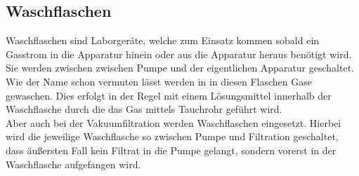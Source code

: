 \subsection{Waschflaschen}
Waschflaschen sind Laborgeräte, welche zum Einsatz kommen sobald ein Gasstrom in die Apparatur hinein oder aus die Apparatur heraus benötigt wird. Sie werden zwischen zwischen Pumpe und der eigentlichen Apparatur geschaltet. \\
Wie der Name schon vermuten lässt werden in in diesen Flaschen Gase gewaschen. Dies erfolgt in der Regel mit einem Lösungsmittel innerhalb der Waschflasche durch die das Gas mittels Tauchrohr geführt wird.\\
Aber auch bei der Vakuumfiltration werden Waschflaschen eingesetzt. Hierbei wird die jeweilige Waschflasche so zwischen Pumpe und Filtration geschaltet, dass äußersten Fall kein Filtrat in die Pumpe gelangt, sondern vorerst in der Waschflasche aufgefangen wird.

